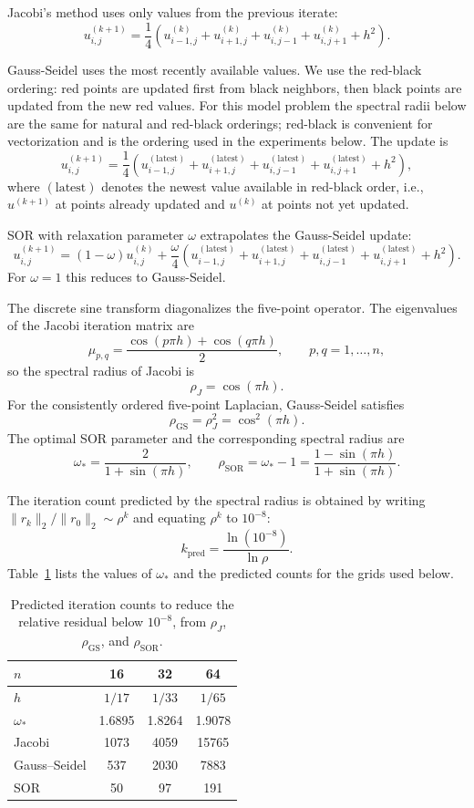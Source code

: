 \documentclass[11pt]{article}
\begin{document}
Jacobi's method uses only values from the previous iterate:
\[
u_{i,j}^{(k+1)}=\frac{1}{4}\left(u_{i-1,j}^{(k)}+u_{i+1,j}^{(k)}+u_{i,j-1}^{(k)}+u_{i,j+1}^{(k)}+h^2\right).
\]

Gauss-Seidel uses the most recently available values. We use the red-black ordering: red points are updated first from black neighbors, then black points are updated from the new red values. For this model problem the spectral radii below are the same for natural and red-black orderings; red-black is convenient for vectorization and is the ordering used in the experiments below. The update is
\[
u_{i,j}^{(k+1)}=\frac{1}{4}\left(u_{i-1,j}^{(\mathrm{latest})}+u_{i+1,j}^{(\mathrm{latest})}+u_{i,j-1}^{(\mathrm{latest})}+u_{i,j+1}^{(\mathrm{latest})}+h^2\right),
\]
where $(\mathrm{latest})$ denotes the newest value available in red-black order, i.e., $u^{(k+1)}$ at points already updated and $u^{(k)}$ at points not yet updated.

SOR with relaxation parameter $\omega$ extrapolates the Gauss-Seidel update:
\[
u_{i,j}^{(k+1)}=(1-\omega)u_{i,j}^{(k)}+\frac{\omega}{4}\left(u_{i-1,j}^{(\mathrm{latest})}+u_{i+1,j}^{(\mathrm{latest})}+u_{i,j-1}^{(\mathrm{latest})}+u_{i,j+1}^{(\mathrm{latest})}+h^2\right).
\]
For $\omega=1$ this reduces to Gauss-Seidel.

The discrete sine transform diagonalizes the five-point operator. The eigenvalues of the Jacobi iteration matrix are
\[
\mu_{p,q}=\frac{\cos(p\pi h)+\cos(q\pi h)}{2},\qquad p,q=1,\dots,n,
\]
so the spectral radius of Jacobi is
\[
\rho_J=\cos(\pi h).
\]
For the consistently ordered five-point Laplacian, Gauss-Seidel satisfies
\[
\rho_{\mathrm{GS}}=\rho_J^2=\cos^2(\pi h).
\]
The optimal SOR parameter and the corresponding spectral radius are
\[
\omega_*=\frac{2}{1+\sin(\pi h)},\qquad
\rho_{\mathrm{SOR}}=\omega_*-1
=\frac{1-\sin(\pi h)}{1+\sin(\pi h)}.
\]

The iteration count predicted by the spectral radius is obtained by writing $\|r_k\|_2/\|r_0\|_2\sim \rho^k$ and equating $\rho^k$ to $10^{-8}$:
\[
k_{\mathrm{pred}}=\frac{\ln(10^{-8})}{\ln \rho}.
\]
Table~\ref{tab:pred} lists the values of $\omega_*$ and the predicted counts for the grids used below.

\begin{table}[htbp]
\centering
\caption{Predicted iteration counts to reduce the relative residual below $10^{-8}$, from $\rho_J$, $\rho_{\mathrm{GS}}$, and $\rho_{\mathrm{SOR}}$.}
\label{tab:pred}
\begin{tabular}{lccc}
\toprule
$n$ & 16 & 32 & 64 \\
\midrule
$h$ & $1/17$ & $1/33$ & $1/65$ \\
$\omega_*$ & 1.6895 & 1.8264 & 1.9078 \\
\midrule
Jacobi & 1073 & 4059 & 15765 \\
Gauss--Seidel & 537 & 2030 & 7883 \\
SOR & 50 & 97 & 191 \\
\bottomrule
\end{tabular}
\end{table}
\end{document}
